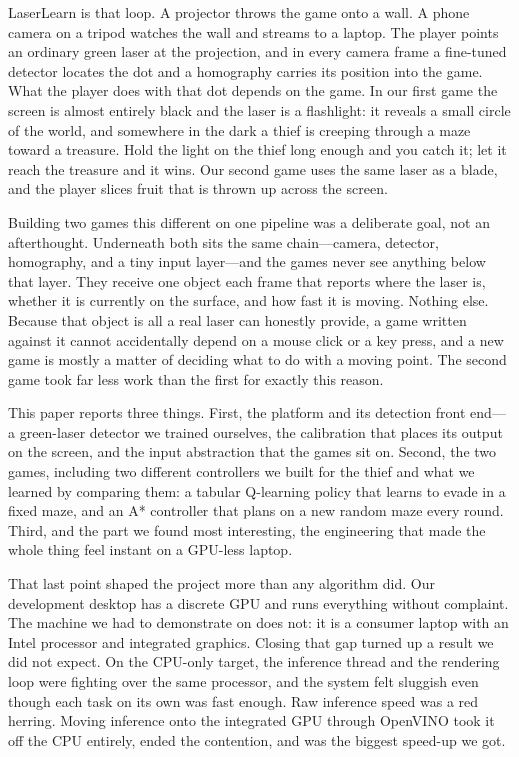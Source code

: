 \documentclass[conference]{IEEEtran}
\begin{document}
LaserLearn is that loop. A projector throws the game onto a wall. A phone camera
on a tripod watches the wall and streams to a laptop. The player points an
ordinary green laser at the projection, and in every camera frame a fine-tuned
detector locates the dot and a homography carries its position into the game.
What the player does with that dot depends on the game. In our first game the
screen is almost entirely black and the laser is a flashlight: it reveals a small
circle of the world, and somewhere in the dark a thief is creeping through a maze
toward a treasure. Hold the light on the thief long enough and you catch it; let
it reach the treasure and it wins. Our second game uses the same laser as a
blade, and the player slices fruit that is thrown up across the screen.

Building two games this different on one pipeline was a deliberate goal, not an
afterthought. Underneath both sits the same chain---camera, detector, homography,
and a tiny input layer---and the games never see anything below that layer. They
receive one object each frame that reports where the laser is, whether it is
currently on the surface, and how fast it is moving. Nothing else. Because that
object is all a real laser can honestly provide, a game written against it cannot
accidentally depend on a mouse click or a key press, and a new game is mostly a
matter of deciding what to do with a moving point. The second game took far less
work than the first for exactly this reason.

This paper reports three things. First, the platform and its detection front
end---a green-laser detector we trained ourselves, the calibration that places
its output on the screen, and the input abstraction that the games sit on.
Second, the two games, including two different controllers we built for the
thief and what we learned by comparing them: a tabular Q-learning policy that
learns to evade in a fixed maze, and an A* controller that plans on a new random
maze every round. Third, and the part we found most interesting, the engineering
that made the whole thing feel instant on a GPU-less laptop.

That last point shaped the project more than any algorithm did. Our development
desktop has a discrete GPU and runs everything without complaint. The machine we
had to demonstrate on does not: it is a consumer laptop with an Intel processor
and integrated graphics. Closing that gap turned up a result we did not expect.
On the CPU-only target, the inference thread and the rendering loop were fighting
over the same processor, and the system felt sluggish even though each task on
its own was fast enough. Raw inference speed was a red herring. Moving inference
onto the integrated GPU through OpenVINO took it off the CPU entirely, ended the
contention, and was the biggest speed-up we got.
\end{document}
